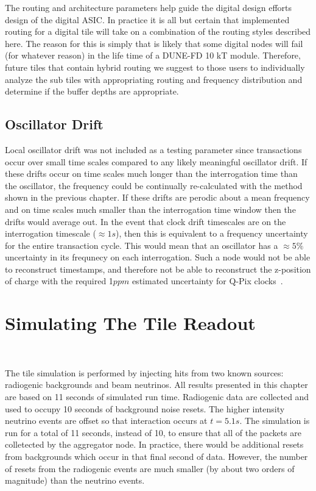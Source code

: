 The routing and architecture parameters help guide the digital design efforts design of the digital ASIC.
In practice it is all but certain that implemented routing for a digital tile will take on a combination of the routing styles described here.
The reason for this is simply that is likely that some digital nodes will fail (for whatever reason) in the life time of a DUNE-FD 10 kT module.
Therefore, future tiles that contain hybrid routing we suggest to those users to individually analyze the sub tiles with appropriating routing and frequency distribution and determine if the buffer depths are appropriate.

\subsection{Oscillator Drift}

Local oscillator drift was not included as a testing parameter since transactions occur over small time scales compared to any likely meaningful oscillator drift.
If these drifts occur on time scales much longer than the interrogation time than the oscillator, the frequency could be continually re-calculated with the method shown in the previous chapter.
If these drifts are perodic about a mean frequency and on time scales much smaller than the interrogation time window then the drifts would average out.
In the event that clock drift timescales are on the interrogation timescale ($\approx 1\unit{s}$), then this is equivalent to a frequency uncertainty for the entire transaction cycle.
This would mean that an oscillator has a $\approx 5\%$ uncertainty in its frequnecy on each interrogation.
Such a node would not be able to reconstruct timestamps, and therefore not be able to reconstruct the z-position of charge with the required 1$\unit{ppm}$ estimated uncertainty for Q-Pix clocks~\citep{qpix:nygren:mei}.

\section{Simulating The Tile Readout}~\label{sec:simulating_tile}

The tile simulation is performed by injecting hits from two known sources: radiogenic backgrounds and beam neutrinos.
All results presented in this chapter are based on 11 seconds of simulated run time.
Radiogenic data are collected and used to occupy 10 seconds of background noise resets.
The higher intensity neutrino events are offset so that interaction occurs at $t = 5.1 s$.
The simulation is run for a total of 11 seconds, instead of 10, to ensure that all of the packets are colletected by the aggregator node.
In practice, there would be additional resets from backgrounds which occur in that final second of data.
However, the number of resets from the radiogenic events are much smaller (by about two orders of magnitude) than the neutrino events.

